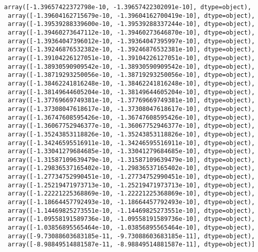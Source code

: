 \documentclass[11pt]{article}
\begin{document}
\begin{tcolorbox}[breakable, size=fbox, boxrule=.5pt, pad at break*=1mm, opacityfill=0]
\begin{Verbatim}[commandchars=\\\{\}]
 array([-1.39657422372798e-10, -1.39657422302091e-10], dtype=object),
 array([-1.39604162715679e-10, -1.39604162700419e-10], dtype=object),
 array([-1.39539288339600e-10, -1.39539288337244e-10], dtype=object),
 array([-1.39460273647112e-10, -1.39460273646870e-10], dtype=object),
 array([-1.39364047396012e-10, -1.39364047395997e-10], dtype=object),
 array([-1.39246876532382e-10, -1.39246876532381e-10], dtype=object),
 array([-1.39104226127051e-10, -1.39104226127051e-10], dtype=object),
 array([-1.38930590909542e-10, -1.38930590909542e-10], dtype=object),
 array([-1.38719293250056e-10, -1.38719293250056e-10], dtype=object),
 array([-1.38462241816248e-10, -1.38462241816248e-10], dtype=object),
 array([-1.38149644605204e-10, -1.38149644605204e-10], dtype=object),
 array([-1.37769669749381e-10, -1.37769669749381e-10], dtype=object),
 array([-1.37308047618617e-10, -1.37308047618617e-10], dtype=object),
 array([-1.36747608595426e-10, -1.36747608595426e-10], dtype=object),
 array([-1.36067752946377e-10, -1.36067752946377e-10], dtype=object),
 array([-1.35243853118826e-10, -1.35243853118826e-10], dtype=object),
 array([-1.34246595516911e-10, -1.34246595516911e-10], dtype=object),
 array([-1.33041279684685e-10, -1.33041279684685e-10], dtype=object),
 array([-1.31587109639479e-10, -1.31587109639479e-10], dtype=object),
 array([-1.29836537165402e-10, -1.29836537165402e-10], dtype=object),
 array([-1.27734752990451e-10, -1.27734752990451e-10], dtype=object),
 array([-1.25219471973713e-10, -1.25219471973713e-10], dtype=object),
 array([-1.22221225368869e-10, -1.22221225368869e-10], dtype=object),
 array([-1.18664457792493e-10, -1.18664457792493e-10], dtype=object),
 array([-1.14469825273551e-10, -1.14469825273551e-10], dtype=object),
 array([-1.09558191589736e-10, -1.09558191589736e-10], dtype=object),
 array([-1.03856895565464e-10, -1.03856895565464e-10], dtype=object),
 array([-9.73088603683185e-11, -9.73088603683185e-11], dtype=object),
 array([-8.98849514881587e-11, -8.98849514881587e-11], dtype=object)]
\end{Verbatim}
\end{tcolorbox}
        
\end{document}
